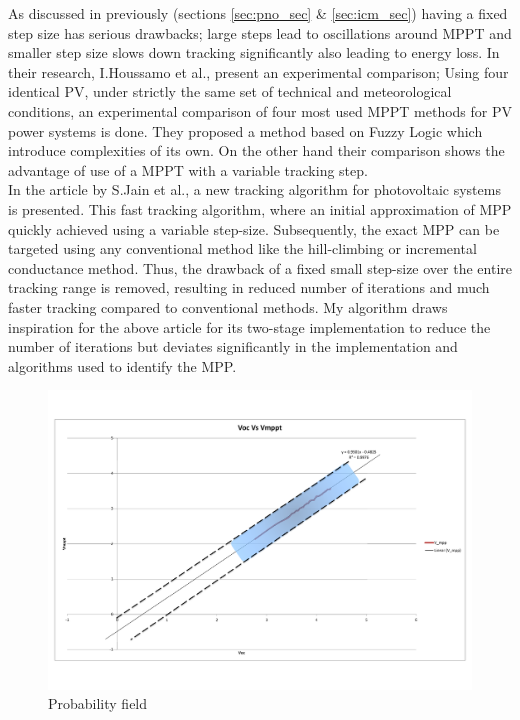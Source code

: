 As discussed in previously (sections \ref{sec:pno_sec} \& \ref{sec:icm_sec}) having a fixed step size has serious drawbacks; large steps lead to oscillations around \ac{MPPT} and smaller step size slows down tracking significantly also leading to energy loss. In their research, I.Houssamo et al.\cite{houssamo2013experimental}, present an experimental comparison; Using four identical PV, under strictly the same set of technical and meteorological conditions, an experimental comparison  of four most used MPPT methods for PV power systems is done. They  proposed a method based on Fuzzy Logic which introduce complexities of its own. On the other hand their comparison shows the advantage of use of a MPPT with a variable tracking step.\\  

In the article by S.Jain et al.\cite{jain2004new}, a new tracking algorithm for photovoltaic systems is presented. This  fast tracking algorithm, where an initial approximation of \ac{MPP} quickly achieved using a variable step-size. Subsequently, the exact \ac{MPP} can be targeted using any conventional method like the hill-climbing or incremental conductance method. Thus, the drawback of a fixed small step-size over the entire tracking range is removed, resulting in reduced number of iterations and much faster tracking compared to conventional methods. My algorithm draws inspiration for the above article for its two-stage implementation to reduce the number of iterations but deviates significantly in the implementation and algorithms used to identify the \ac{MPP}. 
 

\begin{figure}[H]
  \begin{center}
	  \includegraphics[width=1.1\textwidth]{images/Probability_field}
	  \caption{Probability field }
	  \label{fig:Probability_field}
  \end{center}
\end{figure}

